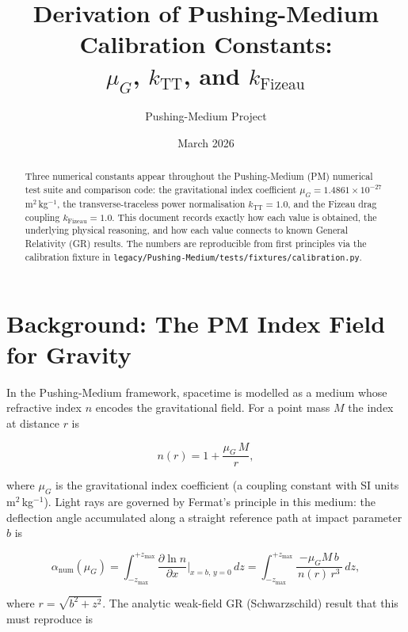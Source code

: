 \documentclass{article}
\title{Derivation of Pushing-Medium Calibration Constants:\\
$\mu_G$, $k_{\mathrm{TT}}$, and $k_{\mathrm{Fizeau}}$}
\author{Pushing-Medium Project}
\date{March 2026}
\begin{document}
\maketitle

\begin{abstract}
Three numerical constants appear throughout the Pushing-Medium (PM) numerical
test suite and comparison code: the gravitational index coefficient
$\mu_G = 1.4861 \times 10^{-27}$\,m$^2$\,kg$^{-1}$, the transverse-traceless
power normalisation $k_{\mathrm{TT}} = 1.0$, and the Fizeau drag coupling
$k_{\mathrm{Fizeau}} = 1.0$.  This document records exactly how each value is
obtained, the underlying physical reasoning, and how each value connects to
known General Relativity (GR) results.  The numbers are reproducible from
first principles via the calibration fixture in
\texttt{legacy/Pushing-Medium/tests/fixtures/calibration.py}.
\end{abstract}

\section{Background: The PM Index Field for Gravity}

In the Pushing-Medium framework, spacetime is modelled as a medium whose
refractive index $n$ encodes the gravitational field.  For a point mass $M$ the
index at distance $r$ is

\begin{equation}
  n(r) = 1 + \frac{\mu_G\, M}{r},
  \label{eq:index}
\end{equation}

where $\mu_G$ is the gravitational index coefficient (a coupling constant with
SI units m$^2$\,kg$^{-1}$).  Light rays are governed by Fermat's principle in
this medium: the deflection angle accumulated along a straight reference path at
impact parameter $b$ is

\begin{equation}
  \alpha_{\mathrm{num}}(\mu_G)
  = \int_{-z_{\max}}^{+z_{\max}}
      \frac{\partial \ln n}{\partial x}\bigg|_{x=b,\,y=0}\, dz
  = \int_{-z_{\max}}^{+z_{\max}}
      \frac{-\mu_G M\, b}{\,n(r)\, r^{3}\,}\, dz,
  \label{eq:alpha_num}
\end{equation}

where $r = \sqrt{b^2 + z^2}$.  The analytic weak-field GR (Schwarzschild)
result that this must reproduce is
\end{document}
